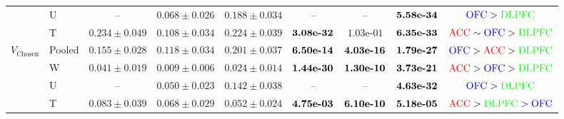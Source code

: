\documentclass[pdflatex,sn-mathphys-num]{sn-jnl}%
\begin{document}
\begin{table}[p]
\begin{tabular*}{\textwidth}{@{\extracolsep{\fill}}llccccccc@{}}
  & U & -- & $0.068 \pm  0.026$ & $0.188 \pm  0.034$ & -- & -- & $\text{\bfseries \mbox{5.58e-34}}$ & $\textcolor{blue}{\mathrm{OFC}} > \textcolor{green}{\mathrm{DLPFC}}$ \\
  & T & $0.234 \pm  0.049$ & $0.108 \pm  0.034$ & $0.224 \pm  0.039$ & $\text{\bfseries \mbox{3.08e-32}}$ & $\mbox{1.03e-01}$ & $\text{\bfseries \mbox{6.35e-33}}$ & $\textcolor{red}{\mathrm{ACC}} \sim \textcolor{blue}{\mathrm{OFC}} > \textcolor{green}{\mathrm{DLPFC}}$ \\
\midrule
$V_{\mathrm{Chosen}}$ & Pooled & $0.155 \pm  0.028$ & $0.118 \pm  0.034$ & $0.201 \pm  0.037$ & $\text{\bfseries \mbox{6.50e-14}}$ & $\text{\bfseries \mbox{4.03e-16}}$ & $\text{\bfseries \mbox{1.79e-27}}$ & $\textcolor{blue}{\mathrm{OFC}} > \textcolor{red}{\mathrm{ACC}} > \textcolor{green}{\mathrm{DLPFC}}$ \\
  & W & $0.041 \pm  0.019$ & $0.009 \pm  0.006$ & $0.024 \pm  0.014$ & $\text{\bfseries \mbox{1.44e-30}}$ & $\text{\bfseries \mbox{1.30e-10}}$ & $\text{\bfseries \mbox{3.73e-21}}$ & $\textcolor{red}{\mathrm{ACC}} > \textcolor{blue}{\mathrm{OFC}} > \textcolor{green}{\mathrm{DLPFC}}$ \\
  & U & -- & $0.050 \pm  0.023$ & $0.142 \pm  0.038$ & -- & -- & $\text{\bfseries \mbox{4.63e-32}}$ & $\textcolor{blue}{\mathrm{OFC}} > \textcolor{green}{\mathrm{DLPFC}}$ \\
  & T & $0.083 \pm  0.039$ & $0.068 \pm  0.029$ & $0.052 \pm  0.024$ & $\text{\bfseries \mbox{4.75e-03}}$ & $\text{\bfseries \mbox{6.10e-10}}$ & $\text{\bfseries \mbox{5.18e-05}}$ & $\textcolor{red}{\mathrm{ACC}} > \textcolor{green}{\mathrm{DLPFC}} > \textcolor{blue}{\mathrm{OFC}}$ \\
\bottomrule\end{tabular*}\endgroup\end{table}
\end{document}
